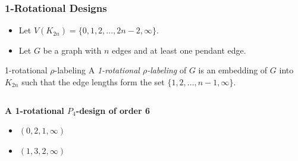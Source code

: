 \documentclass[11pt,serif,professionalfont,aspectratio=169]{beamer}
\newcommand{\vertex}{\node[vertex]}
\theoremstyle{plain}
\begin{document}
\begin{frame}
\frametitle{1-Rotational Designs}
\begin{itemize}
\item Let $V(K_{2n})=\{0,1,2,...,2n-2,\infty\}.$\\

\item Let $G$ be a graph with $n$ edges and at least one pendant edge.
\end{itemize}

\begin{block}{1-rotational $\rho$-labeling}
A \emph{1-rotational $\rho$-labeling} of $G$ is an embedding of $G$ into $K_{2n}$ such that the edge lengths form the set $\{1,2,...,n-1,\infty\}.$
\end{block}

\begin{columns}[T] %
\begin{column}{.48\textwidth}
\textbf{A 1-rotational $P_{4}$-design of order 6}
\begin{itemize}
\item \color{black} $(0,2,1,\infty)$ 
\item \color{blue} $(1,3,2,\infty)$ 

\end{itemize}
\end{column}%
\hfill%
\begin{column}{.48\textwidth}
\begin{center}

\end{center}
\end{column}%
\end{columns}

\end{frame}
\end{document}
